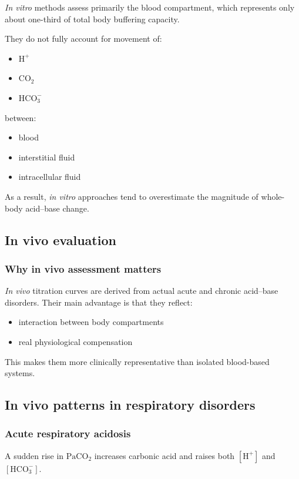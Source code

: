 \documentclass[11pt,a4paper]{article}
\begin{document}
\emph{In vitro} methods assess primarily the blood compartment, which represents only about one-third of total body buffering capacity.

They do not fully account for movement of:
\begin{itemize}
  \item \(\mathrm{H^+}\)
  \item \(\mathrm{CO_2}\)
  \item \(\mathrm{HCO_3^-}\)
\end{itemize}

between:
\begin{itemize}
  \item blood
  \item interstitial fluid
  \item intracellular fluid
\end{itemize}

As a result, \emph{in vitro} approaches tend to overestimate the magnitude of whole-body acid--base change.

\subsection{In vivo evaluation}

\subsubsection{Why in vivo assessment matters}
\emph{In vivo} titration curves are derived from actual acute and chronic acid--base disorders. Their main advantage is that they reflect:
\begin{itemize}
  \item interaction between body compartments
  \item real physiological compensation
\end{itemize}

This makes them more clinically representative than isolated blood-based systems.

\subsection{In vivo patterns in respiratory disorders}

\subsubsection{Acute respiratory acidosis}
A sudden rise in \(\mathrm{PaCO_2}\) increases carbonic acid and raises both \([\mathrm{H^+}]\) and \([\mathrm{HCO_3^-}]\).
\end{document}
